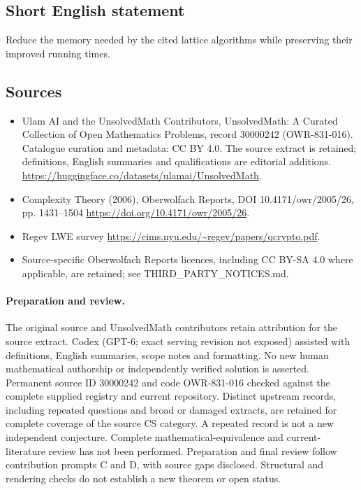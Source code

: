 \documentclass[11pt]{article}
\begin{document}
\subsection{Short English statement}
Reduce the memory needed by the cited lattice algorithms while preserving their improved running times.
\subsection{Sources}
\begin{itemize}
\item[\hypertarget{source:30000242:1}{S1}] Ulam AI and the UnsolvedMath Contributors, UnsolvedMath: A Curated Collection of Open Mathematics Problems, record 30000242 (OWR-831-016). Catalogue curation and metadata: CC BY 4.0. The source extract is retained; definitions, English summaries and qualifications are editorial additions.
\url{https://huggingface.co/datasets/ulamai/UnsolvedMath}.
\item[\hypertarget{source:30000242:2}{S2}] Complexity Theory (2006), Oberwolfach Reports, DOI 10.4171/owr/2005/26, pp. 1431--1504
\url{https://doi.org/10.4171/owr/2005/26}.
\item[\hypertarget{source:30000242:3}{S3}] Regev LWE survey
\url{https://cims.nyu.edu/~regev/papers/qcrypto.pdf}.
\item Source-specific Oberwolfach Reports licences, including CC BY-SA 4.0 where applicable, are retained; see THIRD\_PARTY\_NOTICES.md.
\end{itemize}
\paragraph{Preparation and review.}
The original source and UnsolvedMath contributors retain attribution for the source extract. Codex (GPT-6; exact serving revision not exposed) assisted with definitions, English summaries, scope notes and formatting. No new human mathematical authorship or independently verified solution is asserted. Permanent source ID 30000242 and code OWR-831-016 checked against the complete supplied registry and current repository. Distinct upstream records, including repeated questions and broad or damaged extracts, are retained for complete coverage of the source CS category. A repeated record is not a new independent conjecture. Complete mathematical-equivalence and current-literature review has not been performed. Preparation and final review follow contribution prompts C and D, with source gaps disclosed. Structural and rendering checks do not establish a new theorem or open status.
\label{end:30000242}
\end{document}
